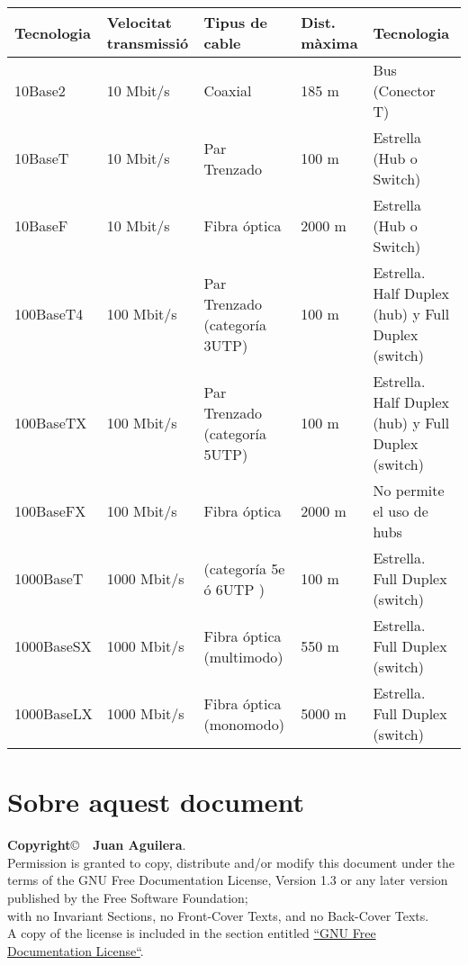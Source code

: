 \documentclass[a4paper]{article}
\begin{document}
\begin{tabular}[]{|p{2cm}|p{2cm}|p{2cm}|p{2cm}|p{2cm}|}
	\hline
	\textbf{Tecnologia}&\textbf{Velocitat transmissió}&\textbf{Tipus de cable}&\textbf{Dist. màxima}&\textbf{Tecnologia} \\
	\hline\hline
	10Base2	&10 Mbit/s	&Coaxial	&185 m	&Bus (Conector T) \\
	\hline
	10BaseT	&10 Mbit/s	&Par Trenzado	&100 m	&Estrella (Hub o Switch)\\
	\hline
	10BaseF	& 10 Mbit/s	& Fibra óptica	& 2000 m	& Estrella (Hub o Switch) \\
	\hline
	100BaseT4	& 100 Mbit/s	& Par Trenzado (categoría 3UTP)	& 100 m	& Estrella. Half Duplex (hub) y Full Duplex (switch) \\
	\hline
	100BaseTX	& 100 Mbit/s	& Par Trenzado (categoría 5UTP)	& 100 m	& Estrella. Half Duplex (hub) y Full Duplex (switch) \\
	\hline
	100BaseFX	& 100 Mbit/s	& Fibra óptica	& 2000 m	& No permite el uso de hubs \\
	\hline
	1000BaseT	& 1000 Mbit/s	& (categoría 5e ó 6UTP )	& 100 m	& Estrella. Full Duplex (switch) \\
	\hline
	1000BaseSX	& 1000 Mbit/s	& Fibra óptica (multimodo)	& 550 m	& Estrella. Full Duplex (switch) \\
	\hline
	1000BaseLX	& 1000 Mbit/s	& Fibra óptica (monomodo)	& 5000 m	& Estrella. Full Duplex (switch) \\
	\hline
\end{tabular}

\section{Sobre aquest document}
\textbf{Copyright}\copyright\ \textbf{\the\year\ Juan Aguilera}.\\
Permission is granted to copy, distribute and/or modify this document under the terms of the GNU Free Documentation License, Version 1.3 or any later version published by the Free Software Foundation;\\
with no Invariant Sections, no Front-Cover Texts, and no Back-Cover Texts.\\
A copy of the license is included in the section entitled \href{http://www.gnu.org/licenses/fdl.html}{``GNU Free Documentation License``}.

\begin{thebibliography}{99}
	\bibitem{<++>} 
\end{thebibliography}
\end{document}
